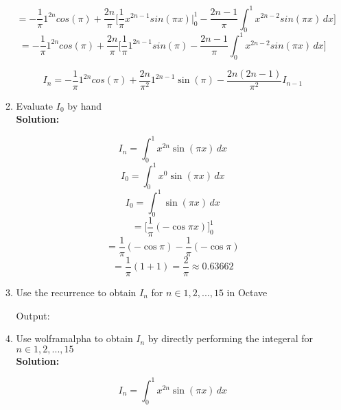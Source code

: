 \documentclass{article}
\begin{document}
\begin{enumerate}
\begin{enumerate}
        $$= - \frac{1}{\pi} 1^{2n} cos(\pi) + \frac{2n}{\pi} \bigg[ \frac{1}{\pi} x^{2n-1} sin(\pi x) \bigg\rvert_{0}^{1} - \frac{2n-1}{\pi} \int_{0}^{1} x^{2n-2} sin(\pi x) \, dx \bigg]$$
        $$= - \frac{1}{\pi} 1^{2n} cos(\pi) + \frac{2n}{\pi} \bigg[ \frac{1}{\pi} 1^{2n-1} sin(\pi) - \frac{2n-1}{\pi} \int_{0}^{1} x^{2n-2} sin(\pi x) \, dx \bigg]$$

        $$I_{n} = - \frac{1}{\pi} 1^{2n} cos(\pi) + \frac{2n}{\pi^{2}} 1^{2n-1} \sin(\pi) - \frac{2n(2n-1)}{\pi^{2}} I_{n-1}$$

\vspace{1cm}

\item Evaluate $I_{0}$ by hand \\

\textbf{Solution:}

        $$I_{n} = \int_{0}^{1} x^{2n} \sin(\pi x) \, dx$$
        $$I_{0} = \int_{0}^{1} x^{0} \sin(\pi x) \, dx$$
        $$I_{0} = \int_{0}^{1} \sin(\pi x) \, dx$$
        $$= \bigg[ \frac{1}{\pi} (-\cos \pi x) \bigg]_{0}^{1}$$
        $$ = \frac{1}{\pi} (-\cos \pi) - \frac{1}{\pi} (-\cos \pi)$$
        $$ = \frac{1}{\pi} (1 + 1) = \frac{2}{\pi} \approx 0.63662$$

\vspace{1cm}

\item Use the recurrence to obtain $I_{n}$ for $n \in {1,2,...,15}$ in Octave

Output:


\vspace{1cm}

\item Use wolframalpha to obtain $I_{n}$ by directly performing the integeral for $n \in {1,2,...,15}$ \\

\textbf{Solution:}

$$I_{n} = \int_{0}^{1} x^{2n} \sin(\pi x) \, dx$$


\end{enumerate}
\end{enumerate}
\end{document}
